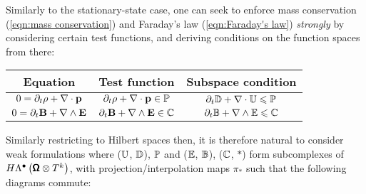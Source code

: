     Similarly to the stationary-state case, one can seek to enforce mass conservation (\ref{eqn:mass conservation}) and Faraday's law (\ref{eqn:Faraday's law}) \emph{strongly} by considering certain test functions, and deriving conditions on the function spaces from there:
    \begin{center}\begin{tabular}{ c | c | c }
        Equation  &  Test function  &  Subspace condition  \\
        \hline\hline
        $0  =  \partial_{t}\rho + \nabla\cdot\mathbf{p}$  &  $\partial_{t}\rho + \nabla\cdot\mathbf{p}  \in  \mathbb{P}$  &  $\partial_{t}\mathbb{D} + \nabla\cdot\mathbb{U}  \leqslant  \mathbb{P}$  \\
        $0  =  \partial_{t}\mathbf{B} + \nabla\wedge\mathbf{E}$  &  $\partial_{t}\mathbf{B} + \nabla\wedge\mathbf{E}  \in  \mathbb{C}$  &  $\partial_{t}\mathbb{B} + \nabla\wedge\mathbb{E}  \leqslant  \mathbb{C}$
    \end{tabular}\end{center}
    Similarly restricting to Hilbert spaces then, it is therefore natural to consider weak formulations where ($\mathbb{U}$, $\mathbb{D}$), $\mathbb{P}$ and ($\mathbb{E}$, $\mathbb{B}$), ($\mathbb{C}$, $*$) form subcomplexes of $H\Lambda^{\bullet}\left(\pmb{\mathsf{\Omega}}\otimes T^{k}\right)$, with projection/interpolation maps $\pi_{*}$ such that the following diagrams commute:
    \begin{center}\end{center}
